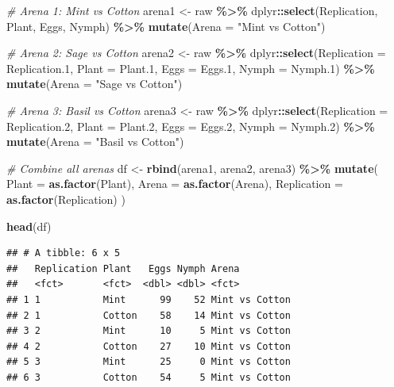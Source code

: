 \documentclass[
]{article}
\newenvironment{Shaded}{\begin{snugshade}}{\end{snugshade}}
\newcommand{\AttributeTok}[1]{\textcolor[rgb]{0.13,0.29,0.53}{#1}}
\newcommand{\CommentTok}[1]{\textcolor[rgb]{0.56,0.35,0.01}{\textit{#1}}}
\newcommand{\FloatTok}[1]{\textcolor[rgb]{0.00,0.00,0.81}{#1}}
\newcommand{\FunctionTok}[1]{\textcolor[rgb]{0.13,0.29,0.53}{\textbf{#1}}}
\newcommand{\NormalTok}[1]{#1}
\newcommand{\OtherTok}[1]{\textcolor[rgb]{0.56,0.35,0.01}{#1}}
\newcommand{\SpecialCharTok}[1]{\textcolor[rgb]{0.81,0.36,0.00}{\textbf{#1}}}
\newcommand{\StringTok}[1]{\textcolor[rgb]{0.31,0.60,0.02}{#1}}
\begin{document}
\begin{Shaded}
\begin{Highlighting}[]
\CommentTok{\# Arena 1: Mint vs Cotton}
\NormalTok{arena1 }\OtherTok{\textless{}{-}}\NormalTok{ raw }\SpecialCharTok{\%\textgreater{}\%}
\NormalTok{  dplyr}\SpecialCharTok{::}\FunctionTok{select}\NormalTok{(Replication, Plant, Eggs, Nymph) }\SpecialCharTok{\%\textgreater{}\%}
  \FunctionTok{mutate}\NormalTok{(}\AttributeTok{Arena =} \StringTok{"Mint vs Cotton"}\NormalTok{)}

\CommentTok{\# Arena 2: Sage vs Cotton}
\NormalTok{arena2 }\OtherTok{\textless{}{-}}\NormalTok{ raw }\SpecialCharTok{\%\textgreater{}\%}
\NormalTok{  dplyr}\SpecialCharTok{::}\FunctionTok{select}\NormalTok{(}\AttributeTok{Replication =}\NormalTok{ Replication}\FloatTok{.1}\NormalTok{, }\AttributeTok{Plant =}\NormalTok{ Plant}\FloatTok{.1}\NormalTok{,}
         \AttributeTok{Eggs =}\NormalTok{ Eggs}\FloatTok{.1}\NormalTok{, }\AttributeTok{Nymph =}\NormalTok{ Nymph}\FloatTok{.1}\NormalTok{) }\SpecialCharTok{\%\textgreater{}\%}
  \FunctionTok{mutate}\NormalTok{(}\AttributeTok{Arena =} \StringTok{"Sage vs Cotton"}\NormalTok{)}

\CommentTok{\# Arena 3: Basil vs Cotton}
\NormalTok{arena3 }\OtherTok{\textless{}{-}}\NormalTok{ raw }\SpecialCharTok{\%\textgreater{}\%}
\NormalTok{ dplyr}\SpecialCharTok{::}\FunctionTok{select}\NormalTok{(}\AttributeTok{Replication =}\NormalTok{ Replication}\FloatTok{.2}\NormalTok{, }\AttributeTok{Plant =}\NormalTok{ Plant}\FloatTok{.2}\NormalTok{,}
         \AttributeTok{Eggs =}\NormalTok{ Eggs}\FloatTok{.2}\NormalTok{, }\AttributeTok{Nymph =}\NormalTok{ Nymph}\FloatTok{.2}\NormalTok{) }\SpecialCharTok{\%\textgreater{}\%}
  \FunctionTok{mutate}\NormalTok{(}\AttributeTok{Arena =} \StringTok{"Basil vs Cotton"}\NormalTok{)}

\CommentTok{\# Combine all arenas}
\NormalTok{df }\OtherTok{\textless{}{-}} \FunctionTok{rbind}\NormalTok{(arena1, arena2, arena3) }\SpecialCharTok{\%\textgreater{}\%}
  \FunctionTok{mutate}\NormalTok{(}
    \AttributeTok{Plant       =} \FunctionTok{as.factor}\NormalTok{(Plant),}
    \AttributeTok{Arena       =} \FunctionTok{as.factor}\NormalTok{(Arena),}
    \AttributeTok{Replication =} \FunctionTok{as.factor}\NormalTok{(Replication)}
\NormalTok{  )}

\FunctionTok{head}\NormalTok{(df)}
\end{Highlighting}
\end{Shaded}

\begin{verbatim}
## # A tibble: 6 x 5
##   Replication Plant   Eggs Nymph Arena         
##   <fct>       <fct>  <dbl> <dbl> <fct>         
## 1 1           Mint      99    52 Mint vs Cotton
## 2 1           Cotton    58    14 Mint vs Cotton
## 3 2           Mint      10     5 Mint vs Cotton
## 4 2           Cotton    27    10 Mint vs Cotton
## 5 3           Mint      25     0 Mint vs Cotton
## 6 3           Cotton    54     5 Mint vs Cotton
\end{verbatim}
\end{document}
